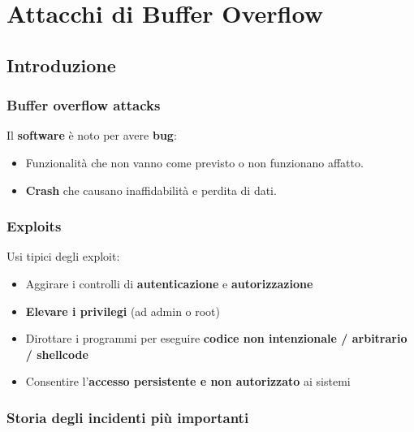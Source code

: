 % 
\chapter{Attacchi di Buffer Overflow}

\section{Introduzione}

\subsection{Buffer overflow attacks}

Il \textbf{software} \`e noto per avere \textbf{bug}:
\begin{itemize}
  \item Funzionalit\`a che non vanno come previsto o non funzionano affatto.
  \item \textbf{Crash} che causano inaffidabilit\`a e perdita di dati.
\end{itemize}


\subsection{Exploits}


Usi tipici degli exploit:
\begin{itemize}
  \item Aggirare i controlli di \textbf{autenticazione} e \textbf{autorizzazione}
  \item \textbf{Elevare i privilegi} (ad admin o root)
  \item Dirottare i programmi per eseguire \textbf{codice non intenzionale / arbitrario / shellcode}
  \item Consentire l'\textbf{accesso persistente e non autorizzato} ai sistemi
\end{itemize}

\subsection{Storia degli incidenti pi\`u importanti}

